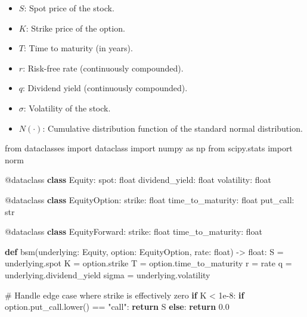 \documentclass[
  letterpaper,
  DIV=11,
  numbers=noendperiod]{scrartcl}
\newenvironment{Shaded}{\begin{snugshade}}{\end{snugshade}}
\newcommand{\AttributeTok}[1]{\textcolor[rgb]{0.40,0.45,0.13}{#1}}
\newcommand{\BuiltInTok}[1]{\textcolor[rgb]{0.00,0.23,0.31}{#1}}
\newcommand{\CommentTok}[1]{\textcolor[rgb]{0.37,0.37,0.37}{#1}}
\newcommand{\ControlFlowTok}[1]{\textcolor[rgb]{0.00,0.23,0.31}{\textbf{#1}}}
\newcommand{\FloatTok}[1]{\textcolor[rgb]{0.68,0.00,0.00}{#1}}
\newcommand{\ImportTok}[1]{\textcolor[rgb]{0.00,0.46,0.62}{#1}}
\newcommand{\KeywordTok}[1]{\textcolor[rgb]{0.00,0.23,0.31}{\textbf{#1}}}
\newcommand{\NormalTok}[1]{\textcolor[rgb]{0.00,0.23,0.31}{#1}}
\newcommand{\OperatorTok}[1]{\textcolor[rgb]{0.37,0.37,0.37}{#1}}
\newcommand{\StringTok}[1]{\textcolor[rgb]{0.13,0.47,0.30}{#1}}
\providecommand{\tightlist}{%
  \setlength{\itemsep}{0pt}\setlength{\parskip}{0pt}}
\begin{document}
\begin{itemize}
\tightlist
\item
  \(S\): Spot price of the stock.
\item
  \(K\): Strike price of the option.
\item
  \(T\): Time to maturity (in years).
\item
  \(r\): Risk-free rate (continuously compounded).
\item
  \(q\): Dividend yield (continuously compounded).
\item
  \(\sigma\): Volatility of the stock.
\item
  \(N(\cdot)\): Cumulative distribution function of the standard normal
  distribution.
\end{itemize}

\begin{Shaded}
\begin{Highlighting}[]
\ImportTok{from}\NormalTok{ dataclasses }\ImportTok{import}\NormalTok{ dataclass}
\ImportTok{import}\NormalTok{ numpy }\ImportTok{as}\NormalTok{ np}
\ImportTok{from}\NormalTok{ scipy.stats }\ImportTok{import}\NormalTok{ norm}

\AttributeTok{@dataclass}
\KeywordTok{class}\NormalTok{ Equity:}
\NormalTok{    spot: }\BuiltInTok{float}
\NormalTok{    dividend\_yield: }\BuiltInTok{float}
\NormalTok{    volatility: }\BuiltInTok{float}

\AttributeTok{@dataclass}
\KeywordTok{class}\NormalTok{ EquityOption:}
\NormalTok{    strike: }\BuiltInTok{float}
\NormalTok{    time\_to\_maturity: }\BuiltInTok{float}
\NormalTok{    put\_call: }\BuiltInTok{str}

\AttributeTok{@dataclass}
\KeywordTok{class}\NormalTok{ EquityForward:}
\NormalTok{    strike: }\BuiltInTok{float}
\NormalTok{    time\_to\_maturity: }\BuiltInTok{float}

\KeywordTok{def}\NormalTok{ bsm(underlying: Equity, option: EquityOption, rate: }\BuiltInTok{float}\NormalTok{) }\OperatorTok{{-}\textgreater{}} \BuiltInTok{float}\NormalTok{:}
\NormalTok{    S }\OperatorTok{=}\NormalTok{ underlying.spot}
\NormalTok{    K }\OperatorTok{=}\NormalTok{ option.strike}
\NormalTok{    T }\OperatorTok{=}\NormalTok{ option.time\_to\_maturity}
\NormalTok{    r }\OperatorTok{=}\NormalTok{ rate}
\NormalTok{    q }\OperatorTok{=}\NormalTok{ underlying.dividend\_yield}
\NormalTok{    sigma }\OperatorTok{=}\NormalTok{ underlying.volatility}

    \CommentTok{\# Handle edge case where strike is effectively zero}
    \ControlFlowTok{if}\NormalTok{ K }\OperatorTok{\textless{}} \FloatTok{1e{-}8}\NormalTok{:}
        \ControlFlowTok{if}\NormalTok{ option.put\_call.lower() }\OperatorTok{==} \StringTok{"call"}\NormalTok{:}
            \ControlFlowTok{return}\NormalTok{ S }
        \ControlFlowTok{else}\NormalTok{:}
            \ControlFlowTok{return} \FloatTok{0.0}


\end{Highlighting}
\end{Shaded}
\end{document}
